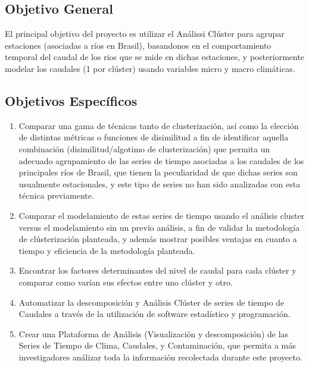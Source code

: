 \documentclass[10pt,a4paper]{article}
\begin{document}
\subsection{Objetivo General}
El principal objetivo del proyecto es utilizar el Análissi Clúster para agrupar estaciones (asociadas a ríos en Brasil), basandonos en el comportamiento temporal del caudal de los rios que se mide en dichas estaciones, y posteriormente modelar los caudales (1 por clúster) usando variables micro y macro climáticas.


\subsection{Objetivos Específicos}
\begin{enumerate}

\item Comparar una gama de técnicas tanto de clusterización, así como la elección de distintas métricas o funciones de disimilitud a fin de identificar aquella combinación (disimilitud/algotimo de clusterización) que permita un adecuado agrupamiento de las series de tiempo asociadas a los caudales de los principales ríos de Brasil, que tienen la peculiaridad de que dichas series son usualmente estacionales, y este tipo de series no han sido analizadas con esta técnica previamente.

\item Comparar el modelamiento de estas series de tiempo usando el análisis cluster versus el modelamiento sin un previo análisis, a fin de validar la metodología de clústerización planteada, y además mostrar posibles ventajas en cuanto a tiempo y eficiencia de la metodología planteada.

\item Encontrar los factores determinantes del nivel de caudal para cada clúster y comparar como varían sus efectos entre uno clúster y otro.

\item Automatizar la descomposición y Análisis Clúster de series de tiempo de Caudales a través de la utilización de software estadístico y programación.

\item Crear una Plataforma de Análisis (Visualización y descomposición) de las Series de Tiempo de Clima, Caudales, y Contaminación, que permita a más investigadores análizar toda la información recolectada durante este proyecto.

\end{enumerate}
\end{document}
